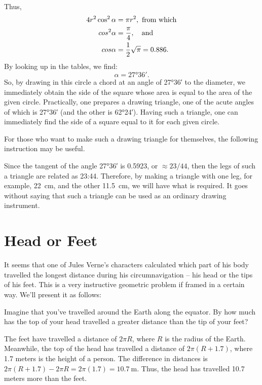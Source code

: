 Thus,
\begin{align*}%
4r^{2} \cos^{2} \alpha & = \pi r^{2}, \,\, \text{from which}\\
cos^{2} \alpha & = \frac{\pi}{4}, \qand \\
cos \alpha & = \frac{1}{2} \sqrt{\pi} = 0.886.
\end{align*}
By looking up in the tables, we find:
\begin{equation*}%
\alpha = \ang{27;36}.
\end{equation*}
So, by drawing in this circle a chord at an angle of \ang{27;36} to the diameter, we immediately obtain the side of the square whose area is equal to the area of the given circle. Practically, one prepares a drawing triangle, one of the acute angles of which is \ang{27;36} (and the other is \ang{62;24}). Having such a triangle, one can immediately find the side of a square equal to it for each given circle.

For those who want to make such a drawing triangle for themselves, the following instruction may be useful.

Since the tangent of the angle \ang{27;36} is 0.5923, or $\approx 23/44$, then the legs of such a triangle are related as 23:44. Therefore, by making a triangle with one leg, for example, \SI{22}{\centi\meter}, and the other \SI{11.5}{\centi\meter}, we will have what is required. It goes without saying that such a triangle can be used as an ordinary drawing instrument.


\section{Head or Feet}
\label{sec-9.8}

It seems that one of Jules Verne's characters calculated which part of his body travelled the longest distance during his circumnavigation -- his head or the tips of his feet. This is a very instructive geometric problem if framed in a certain way. We'll present it as follows:


\ques Imagine that you've travelled around the Earth along the equator. By how much has the top of your head travelled a greater distance than the tip of your feet?


\ans The feet have travelled a distance of $2\pi R$, where $R$ is the radius of the Earth. Meanwhile, the top of the head has travelled a distance of $2\pi(R + 1.7)$, where 1.7 meters is the height of a person. The difference in distances is $2\pi(R + 1.7) - 2\pi R = 2\pi(1.7) = \SI{10.7}{\meter}$. Thus, the head has travelled 10.7 meters more than the feet.

